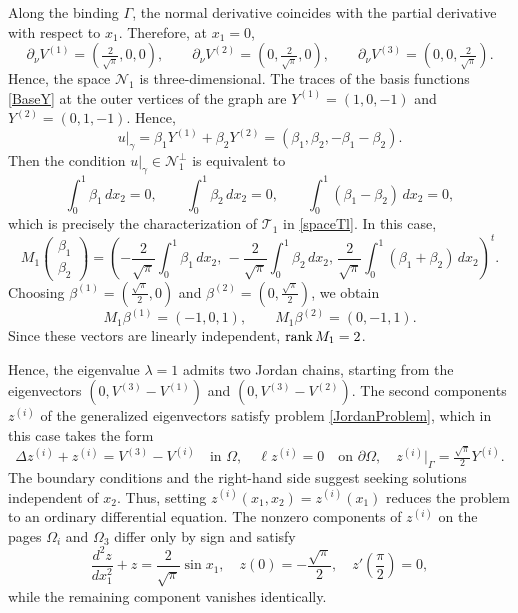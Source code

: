 \documentclass[reqno]{amsart}
\theoremstyle{definition}
\theoremstyle{remark}
\numberwithin{equation}{section}
\newcommand{\rank}{\mathop{\rm rank}}
\newcommand{\cN}{\mathcal{N}}
\newcommand{\cT}{\mathcal{T}}
\begin{document}
Along the binding $\Gamma$, the normal derivative coincides with the partial derivative with respect to $x_1$. Therefore, at $x_1=0$,
\begin{equation*}%
    \partial_\nu V^{(1)}=\left(\tfrac{2}{\sqrt{\pi}},0,0\right),\qquad
    \partial_\nu V^{(2)}=\left(0,\tfrac{2}{\sqrt{\pi}},0\right),\qquad
    \partial_\nu V^{(3)}=\left(0,0,\tfrac{2}{\sqrt{\pi}}\right).
\end{equation*}
Hence, the space $\cN_1$ is three-dimensional. The traces of the basis functions \eqref{BaseY} at the outer vertices of the graph are $Y^{(1)}=(1,0,-1)$ and $Y^{(2)}=(0,1,-1)$. Hence, 
\begin{equation*}
u|_\gamma=\beta_1Y^{(1)}+\beta_2Y^{(2)}=(\beta_1,\beta_2,-\beta_1-\beta_2).
\end{equation*}
Then the condition
$u|_\gamma\in\cN_1^\perp$ is equivalent to
\begin{equation*}
\int_0^1\beta_1\,dx_2=0,\qquad
\int_0^1\beta_2\,dx_2=0,\qquad \int_0^1(\beta_1-\beta_2)\,dx_2=0,
\end{equation*}
which is precisely the characterization of $\cT_1$ in \eqref{spaceTl}.  In this case,
\begin{equation*}
M_1\begin{pmatrix}
     \beta_1 \\
     \beta_2 
   \end{pmatrix}
=\left(
-\frac{2}{\sqrt{\pi}}\int_0^1\beta_1\,dx_2,\,
-\frac{2}{\sqrt{\pi}}\int_0^1\beta_2\,dx_2,\,
\frac{2}{\sqrt{\pi}}\int_0^1(\beta_1+\beta_2)\,dx_2
\right)^t.
\end{equation*}
Choosing $\beta^{(1)}=\left(\tfrac{\sqrt{\pi}}{2},0\right)$ and $\beta^{(2)}=\left(0,\tfrac{\sqrt{\pi}}{2}\right)$, we obtain
\begin{equation*}
M_1\beta^{(1)}=(-1,0,1),\qquad M_1\beta^{(2)}=(0,-1,1).
\end{equation*}
Since these vectors are linearly independent, $\rank M_1=2$. 

Hence, the eigenvalue $\lambda=1$ admits two Jordan chains, starting from the eigenvectors $\left(0,V^{(3)}-V^{(1)}\right)$ and $\left(0,V^{(3)}-V^{(2)}\right)$.
The second components $z^{(i)}$ of the generalized eigenvectors satisfy  problem \eqref{JordanProblem}, which in this case takes the form
\begin{equation*}
\Delta z^{(i)}+z^{(i)}=V^{(3)}-V^{(i)}\quad\text{in }\Omega,\quad
\ell z^{(i)}=0\quad\text{on }\partial\Omega,\quad z^{(i)}|_\Gamma=\tfrac{\sqrt{\pi}}{2}Y^{(i)}.
\end{equation*}
The boundary conditions and the right-hand side suggest seeking solutions independent of $x_2$. Thus, setting $z^{(i)}(x_1,x_2)=z^{(i)}(x_1)$ reduces the problem to an ordinary differential equation. The nonzero components of $z^{(i)}$ on the pages $\Omega_i$ and $\Omega_3$ differ only by sign and satisfy
\begin{equation*}
\frac{d^2 z}{dx_1^2}+z=\frac{2}{\sqrt{\pi}}\sin x_1,\quad
z(0)=-\frac{\sqrt{\pi}}{2},\quad
z'\!\left(\frac{\pi}{2}\right)=0,
\end{equation*}
while the remaining component vanishes identically.
\end{document}
